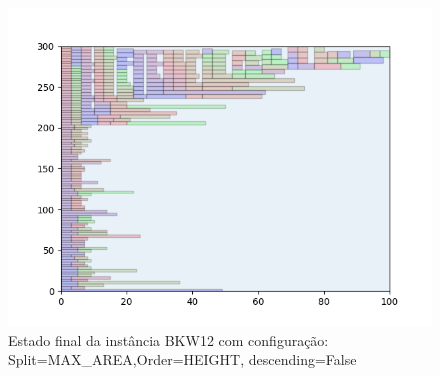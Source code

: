 \begin{figure}[H]
    \centering
    \caption[]{Estado final da instância BKW12 com configuração: Split=MAX_AREA,Order=HEIGHT, descending=False}
    \label{fig:bkw12-max_area-height-false}
    \includegraphics[scale=0.5]{output/figures/bkw/bkw12/max_area/height/false/000}
\end{figure}